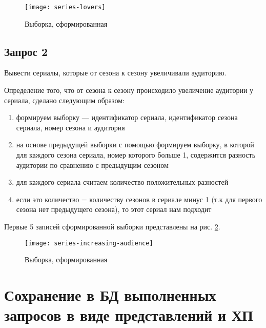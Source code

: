 \begin{figure}[H]
	\centering
	\texttt{[image: series-lovers]}
	\caption{Выборка, сформированная }
	\label{fig:series-lovers}
\end{figure}

\subsection{Запрос 2}

Вывести сериалы, которые от сезона к сезону увеличивали аудиторию.



Определение того, что от сезона к сезону происходило увеличение аудитории у сериала, сделано следующим образом:

\begin{enumerate}
	\item формируем выборку  --- идентификатор сериала, идентификатор сезона сериала, номер сезона и аудитория
	\item на основе предыдущей выборки с помощью  формируем выборку, в которой для каждого сезона сериала, номер которого больше 1, содержится разность аудитории по сравнению с предыдущим сезоном
	\item для каждого сериала считаем количество положительных разностей
	\item если это количество = количеству сезонов в сериале минус 1 (т.к для первого сезона нет предыдущего сезона), то этот сериал нам подходит
\end{enumerate}

Первые 5 записей сформированной выборки представлены на рис. \ref{fig:series-increasing-audience}.

\begin{figure}[H]
	\centering
	\texttt{[image: series-increasing-audience]}
	\caption{Выборка, сформированная }
	\label{fig:series-increasing-audience}
\end{figure}

\section{Сохранение в БД выполненных запросов в виде представлений и ХП}

